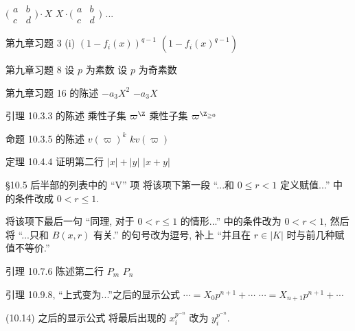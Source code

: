 \documentclass{AJerrata}
\begin{document}
\begin{Errata}
		\Orig $\bigl( \begin{smallmatrix} a & b \\ c & d \end{smallmatrix} \bigr) \cdot X$
		\Corr $X \cdot \bigl( \begin{smallmatrix} a & b \\ c & d \end{smallmatrix} \bigr)$ ...
		
		\item[第九章习题 3 (i)]
		\Orig $\left( 1 - f_i(x) \right)^{q-1}$
		\Corr $\left( 1 - f_i(x)^{q-1} \right)$
		
		\item[第九章习题 8]
		\Orig 设 $p$ 为素数
		\Corr 设 $p$ 为奇素数
		
		\item[第九章习题 16 的陈述]
		\Orig $-a_3 X^2$
		\Corr $-a_3 X$
		
		\item[引理 10.3.3 的陈述]
		\Orig 乘性子集 $\varpi^{\Z}$
		\Corr 乘性子集 $\varpi^{\Z_{\geq 0}}$
		
		\item[命题 10.3.5 的陈述]
		\Orig $v(\varpi)^k$
		\Corr $kv(\varpi)$
		
		\item[定理 10.4.4 证明第二行]
		\Orig $|x|+|y|$
		\Corr $|x+y|$
		
		\item[\S 10.5 后半部的列表中的 ``V'' 项]
		将该项下第一段 ``...和 $0 \leq r < 1$ 定义赋值...'' 中的条件改成 $0 < r \leq 1$.
		
		将该项下最后一句 ``同理, 对于 $0 < r \leq 1$ 的情形...'' 中的条件改为 $0 < r < 1$, 然后将 ``...只和 $B(x, r)$ 有关.'' 的句号改为逗号, 补上 ``并且在 $r \in |K|$ 时与前几种赋值不等价.''
		
		\item[引理 10.7.6 陈述第二行]
		\Orig $P_m$
		\Corr $P_n$
		
		\item[引理 10.9.8, ``上式变为...''之后的显示公式]
		\Orig $\cdots = X_0 p^{n+1} + \cdots$
		\Corr $\cdots = X_{n+1} p^{n+1} + \cdots$
		
		\item[(10.14) 之后的显示公式]
		将最后出现的 $x_i^{p^{-n}}$ 改为 $y_i^{p^{-n}}$.
	\end{Errata}
\end{document}
